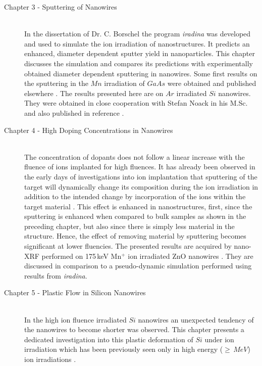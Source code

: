\begin{description}
  \item[\normalfont Chapter 3 - Sputtering of Nanowires] \hfill \\
  In the dissertation of Dr. C. Borschel \cite{borschel_ion-solid_2012} the program \emph{iradina} \cite{borschel_ion_2011} was developed and used to simulate the ion irradiation of nanostructures. It predicts an enhanced, diameter dependent sputter yield in nanoparticles. This chapter discusses the simulation and compares its predictions with experimentally obtained diameter dependent sputtering in nanowires. Some first results on the sputtering in the $Mn$ irradiation of $GaAs$ were obtained and published elsewhere \cite{johannes_enhanced_2014}. The results presented here are on $Ar$ irradiated $Si$ nanowires. They were obtained in close cooperation with Stefan Noack in his M.Sc. and also published in reference \cite{johannes_anomalous_2015}.
  \item[\normalfont Chapter 4 - High Doping Concentrations in Nanowires] \hfill \\
  The concentration of dopants does not follow a linear increase with the fluence of ions implanted for high fluences. It has already been observed in the early days of investigations into ion implantation that sputtering of the target will dynamically change its composition during the ion irradiation in addition to the intended change by incorporation of the ions within the target material \cite{moller_tridyn_1984,moller_tridyn-binary_1988,miyagawa_computer_1991,sigmund_alloy_1993,eckstein_oscillations_2000}. This effect is enhanced in nanostructures, first, since the sputtering is enhanced when compared to bulk samples as shown in the preceding chapter, but also since there is simply less material in the structure. Hence, the effect of removing material by sputtering becomes significant at lower fluencies. The presented results are acquired by nano-XRF performed on 175\,keV Mn$^+$ ion irradiated ZnO nanowires \cite{johannes_enhanced_2014}. They are discussed in comparison to a pseudo-dynamic simulation performed using results from \emph{iradina}.
  \item[\normalfont Chapter 5 - Plastic Flow in Silicon Nanowires] \hfill \\
  In the high ion fluence irradiated $Si$ nanowires an unexpected tendency of the nanowires to become shorter was observed. This chapter presents a dedicated investigation into this plastic deformation of $Si$ under ion irradiation which has been previously seen only in high energy ($\ge\,MeV$) ion irradiations \cite{volkert_stress_1991,trinkaus_viscoelastic_1995,hedler_amorphous_2004,hedler_boundary_2005}.
\end{description}
